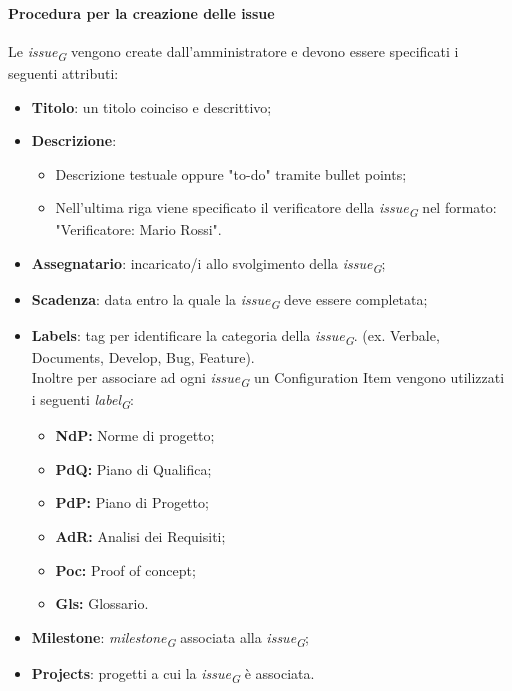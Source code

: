 \hypertarget{par:proceduraCreazioneIssue}{\paragraph*{Procedura per la creazione delle issue}}
Le \textit{issue}\textsubscript{\textit{G}} vengono create dall'amministratore e devono essere specificati i seguenti attributi:
\begin{itemize}
		\item \textbf{Titolo}: un titolo coinciso e descrittivo;
		\item \textbf{Descrizione}:
		\begin{itemize}
				\item Descrizione testuale oppure "to-do" tramite bullet points;
				\item Nell'ultima riga viene specificato il verificatore della \textit{issue}\textsubscript{\textit{G}} nel formato: "Verificatore: Mario Rossi".
		\end{itemize} 
		\item \textbf{Assegnatario}: incaricato/i allo svolgimento della \textit{issue}\textsubscript{\textit{G}};
		\item \textbf{Scadenza}: data entro la quale la \textit{issue}\textsubscript{\textit{G}} deve essere completata;
		\item \textbf{Labels}: tag per identificare la categoria della \textit{issue}\textsubscript{\textit{G}}. (ex. Verbale, Documents, Develop, Bug, Feature).\\
		Inoltre per associare ad ogni \textit{issue}\textsubscript{\textit{G}} un Configuration Item vengono utilizzati i seguenti \textit{label}\textsubscript{\textit{G}}:
		\begin{itemize}
				\item \textbf{NdP:} Norme di progetto;
				\item \textbf{PdQ:} Piano di Qualifica;
				\item \textbf{PdP:} Piano di Progetto;
				\item \textbf{AdR:} Analisi dei Requisiti;
				\item \textbf{Poc:} Proof of concept;
				\item \textbf{Gls:} Glossario.
		\end{itemize}
		\item \textbf{Milestone}: \textit{milestone}\textsubscript{\textit{G}} associata alla \textit{issue}\textsubscript{\textit{G}};
		\item \textbf{Projects}: progetti a cui la \textit{issue}\textsubscript{\textit{G}} è associata. \\

\end{itemize}
